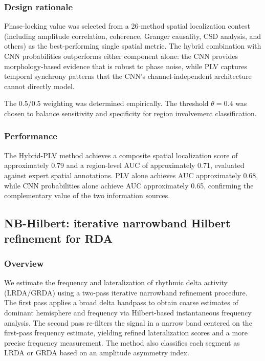 \subsubsection{Design rationale}

Phase-locking value was selected from a 26-method spatial localization contest (including amplitude correlation, coherence, Granger causality, CSD analysis, and others) as the best-performing single spatial metric. The hybrid combination with CNN probabilities outperforms either component alone: the CNN provides morphology-based evidence that is robust to phase noise, while PLV captures temporal synchrony patterns that the CNN's channel-independent architecture cannot directly model.

The 0.5/0.5 weighting was determined empirically. The threshold $\theta = 0.4$ was chosen to balance sensitivity and specificity for region involvement classification.

\subsubsection{Performance}

The Hybrid-PLV method achieves a composite spatial localization score of approximately 0.79 and a region-level AUC of approximately 0.71, evaluated against expert spatial annotations. PLV alone achieves AUC approximately 0.68, while CNN probabilities alone achieve AUC approximately 0.65, confirming the complementary value of the two information sources.

\subsection{NB-Hilbert: iterative narrowband Hilbert refinement for RDA}
\label{app:nb_hilbert}

\subsubsection{Overview}

We estimate the frequency and lateralization of rhythmic delta activity (LRDA/GRDA) using a two-pass iterative narrowband refinement procedure. The first pass applies a broad delta bandpass to obtain coarse estimates of dominant hemisphere and frequency via Hilbert-based instantaneous frequency analysis. The second pass re-filters the signal in a narrow band centered on the first-pass frequency estimate, yielding refined lateralization scores and a more precise frequency measurement. The method also classifies each segment as LRDA or GRDA based on an amplitude asymmetry index.

